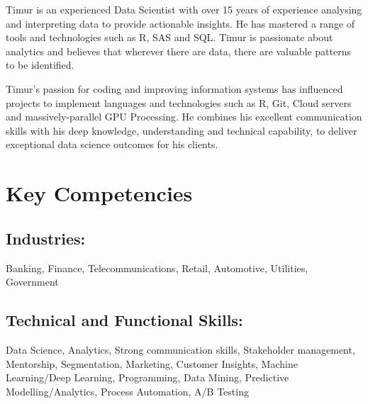 \documentclass{article}
\begin{document}

\pagestyle{fancy}
\fancyhf{} %



Timur is an experienced Data Scientist with over 15 years of experience analysing and interpreting data to provide actionable insights. He has mastered a range of tools and technologies such as R, SAS and SQL. Timur is passionate about analytics and believes that wherever there are data, there are valuable patterns to be identified.

Timur's passion for coding and improving information systems has influenced projects to implement languages and technologies such as R, Git, Cloud servers and massively-parallel GPU
Processing. He combines his excellent communication skills with his deep knowledge, understanding and technical capability, to deliver exceptional data science outcomes for his clients.

\section{Key Competencies}
\subsection{Industries:}
Banking, Finance, Telecommunications, Retail, Automotive, Utilities, Government

\subsection{Technical and Functional Skills:}
Data Science, Analytics, Strong communication skills, Stakeholder management, Mentorship, Segmentation, Marketing, Customer Insights, Machine Learning/Deep Learning, Programming, Data Mining, Predictive Modelling/Analytics, Process Automation, A/B Testing
\end{document}
